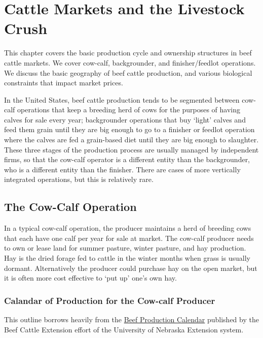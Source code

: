 \documentclass[]{book}
\theoremstyle{definition}
\theoremstyle{definition}
\theoremstyle{remark}
\begin{document}
\chapter{Cattle Markets and the Livestock
Crush}\label{cattle-markets-and-the-livestock-crush}

This chapter covers the basic production cycle and ownership structures
in beef cattle markets. We cover cow-calf, backgrounder, and
finisher/feedlot operations. We discuss the basic geography of beef
cattle production, and various biological constraints that impact market
prices.

In the United States, beef cattle production tends to be segmented
between cow-calf operations that keep a breeding herd of cows for the
purposes of having calves for sale every year; backgrounder operations
that buy `light' calves and feed them grain until they are big enough to
go to a finisher or feedlot operation where the calves are fed a
grain-based diet until they are big enough to slaughter. These three
stages of the production process are usually managed by independent
firms, so that the cow-calf operator is a different entity than the
backgrounder, who is a different entity than the finisher. There are
cases of more vertically integrated operations, but this is relatively
rare.

\section{The Cow-Calf Operation}\label{the-cow-calf-operation}

In a typical cow-calf operation, the producer maintains a herd of
breeding cows that each have one calf per year for sale at market. The
cow-calf producer needs to own or lease land for summer pasture, winter
pasture, and hay production. Hay is the dried forage fed to cattle in
the winter months when grass is usually dormant. Alternatively the
producer could purchase hay on the open market, but it is often more
cost effective to `put up' one's own hay.

\subsection{Calandar of Production for the Cow-calf
Producer}\label{calandar-of-production-for-the-cow-calf-producer}

This outline borrows heavily from the
\href{http://beef.unl.edu/beefprodcal.shtml}{Beef Production Calendar}
published by the Beef Cattle Extension effort of the University of
Nebraska Extension system.
\end{document}

